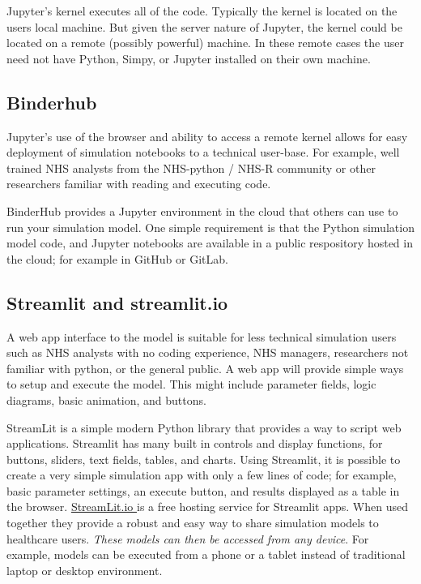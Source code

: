 \documentclass{swpaperproc}
\theoremstyle{sw}
\begin{document}
Jupyter's kernel executes all of the code.  Typically the kernel is located on the users local machine.  But given the server nature of Jupyter, the kernel could be located on a remote (possibly powerful) machine.  In these remote cases the user need not have Python, Simpy, or Jupyter installed on their own machine.

\subsection{Binderhub}

Jupyter's use of the browser and ability to access a remote kernel allows for easy deployment of simulation notebooks to a technical user-base.  For example, well trained NHS analysts from the NHS-python / NHS-R community or other researchers familiar with reading and executing code.

BinderHub provides a Jupyter environment in the cloud that others can use to run your simulation model.  One simple requirement is that the Python simulation model code, and Jupyter notebooks are available in a public respository hosted in the cloud; for example in GitHub or GitLab. 

\subsection{Streamlit and streamlit.io}

A web app interface to the model is suitable for less technical simulation users such as NHS analysts with no coding experience, NHS managers, researchers not familiar with python, or the general public. A web app will provide simple ways to setup and execute the model. This might include parameter fields, logic diagrams, basic animation, and buttons.   

StreamLit is a simple modern Python library that provides a way to script web applications. Streamlit has many built in controls and display functions, for buttons, sliders, text fields, tables, and charts. Using Streamlit, it is possible to create a very simple simulation app with only a few lines of code; for example, basic parameter settings, an execute button, and results displayed as a table in the browser.  \url{StreamLit.io } is a free hosting service for Streamlit apps.  When used together they provide a robust and easy way to share simulation models to healthcare users. \textit{These models can then be accessed from any device}.  For example, models can be executed from a phone or a tablet instead of traditional laptop or desktop environment. 
\end{document}
